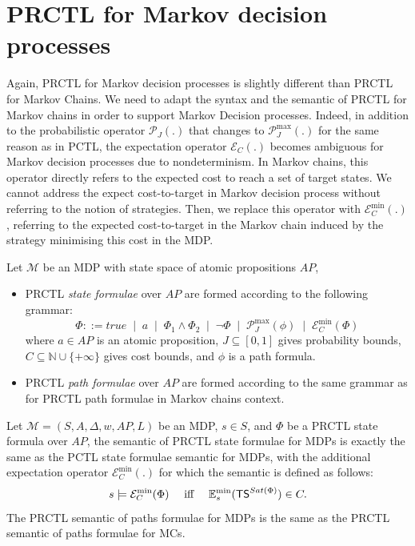 \section{PRCTL for Markov decision processes}\label{PRCTL-MDP}
Again, PRCTL for Markov decision processes is slightly different than PRCTL for Markov Chains.
We need to adapt the syntax and the semantic of PRCTL for Markov chains in order to support Markov Decision processes.
Indeed, in addition to the probabilistic operator $\mathcal{P}_J(.)$ that changes to $\mathcal{P}_J^{\max}(.)$ for the same reason as in PCTL,
the expectation operator $\mathcal{E}_C(.)$ becomes ambiguous for Markov decision processes due to nondeterminism.
In Markov chains, this operator directly refers to the expected cost to reach a set of target states.
We cannot address the expect cost-to-target in Markov decision process without referring to the notion of strategies.
Then, we replace this operator with $\mathcal{E}^{\min}_C(.)$, referring to the expected cost-to-target in the Markov chain induced by the strategy minimising this cost in the MDP.

\begin{definition}
Let $\mathcal{M}$ be an MDP with state space of atomic propositions $AP$,
\begin{itemize}
  \item PRCTL \textit{state formulae} over $AP$ are formed according to the following grammar:
  \[
    \Phi ::= true \;\; | \;\; a \;\; | \;\; \Phi_1 \wedge \Phi_2 \;\; | \;\; \neg \Phi \;\; | \;\; \mathcal{P}^{\max}_J(\phi) \;\; | \;\; \mathcal{E}^{\min}_C(\Phi)
  \]
  where $a \in AP$ is an atomic proposition, $J \subseteq [0, 1]$ gives probability bounds, $C \subseteq \mathbb{N} \cup \{+\infty\}$ gives cost bounds, and $\phi$ is a path formula.
  \item PRCTL \textit{path formulae} over $AP$ are formed according to the same grammar as for PRCTL path formulae in Markov chains context.
\end{itemize}
\end{definition}
\begin{definition}
  Let $\mathcal{M} = (S,A, \Delta, w, AP, L)$ be an MDP, $s \in S$, and $\Phi$ be a PRCTL state formula over $AP$,
  the semantic of PRCTL state formulae for MDPs is exactly the same as the PCTL state formulae semantic for MDPs, with the additional expectation operator $\mathcal{E}^{\min}_C(.)$ for which the semantic is defined as follows:
  \[
  s \models \mathcal{E}^{\min}_C(\Phi) \quad \text{ iff }\quad \mathbb{E}^{\min}_s(\text{\sffamily TS}^{Sat(\Phi)}) \in C.
  \]
  The PRCTL semantic of paths formulae for MDPs is the same as the PRCTL semantic of paths formulae for MCs.
\end{definition}

